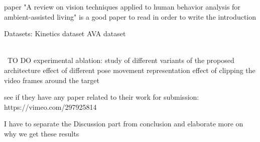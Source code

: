 paper "A review on vision techniques applied to human behavior analysis for ambient-assisted living" is a good paper to read in order to write the introduction

Datasets:
Kinetics dataset
AVA dataset



\\\ TO DO
experimental ablation:
study of different variants of the proposed architecture
effect of different pose movement representation
effect of clipping the video frames around the target

see if they have any paper related to their work for submission: https://vimeo.com/297925814


I have to separate the Discussion part from conclusion and elaborate more on why we get these results